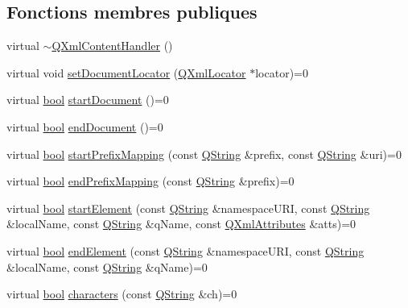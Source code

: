 \subsection*{Fonctions membres publiques}
\begin{DoxyCompactItemize}
\item 
virtual \hyperlink{class_q_xml_content_handler_a217939b7d7636fb8d52b415a890939a3}{$\sim$\+Q\+Xml\+Content\+Handler} ()
\item 
virtual void \hyperlink{class_q_xml_content_handler_a89863bd9a6372d3d73086aa99107bca7}{set\+Document\+Locator} (\hyperlink{class_q_xml_locator}{Q\+Xml\+Locator} $\ast$locator)=0
\item 
virtual \hyperlink{qglobal_8h_a1062901a7428fdd9c7f180f5e01ea056}{bool} \hyperlink{class_q_xml_content_handler_aaca36268e66c9a56257e38bce18ae4d2}{start\+Document} ()=0
\item 
virtual \hyperlink{qglobal_8h_a1062901a7428fdd9c7f180f5e01ea056}{bool} \hyperlink{class_q_xml_content_handler_a534bd1e4627e65340eb17d90d1ab1c12}{end\+Document} ()=0
\item 
virtual \hyperlink{qglobal_8h_a1062901a7428fdd9c7f180f5e01ea056}{bool} \hyperlink{class_q_xml_content_handler_acdf18588f1980d19d12efd025a5f5cc9}{start\+Prefix\+Mapping} (const \hyperlink{class_q_string}{Q\+String} \&prefix, const \hyperlink{class_q_string}{Q\+String} \&uri)=0
\item 
virtual \hyperlink{qglobal_8h_a1062901a7428fdd9c7f180f5e01ea056}{bool} \hyperlink{class_q_xml_content_handler_a1c7f3e794c2e763e043eef3229ccf034}{end\+Prefix\+Mapping} (const \hyperlink{class_q_string}{Q\+String} \&prefix)=0
\item 
virtual \hyperlink{qglobal_8h_a1062901a7428fdd9c7f180f5e01ea056}{bool} \hyperlink{class_q_xml_content_handler_af6d4e631fad2b9b75622c95003b1da55}{start\+Element} (const \hyperlink{class_q_string}{Q\+String} \&namespace\+U\+R\+I, const \hyperlink{class_q_string}{Q\+String} \&local\+Name, const \hyperlink{class_q_string}{Q\+String} \&q\+Name, const \hyperlink{class_q_xml_attributes}{Q\+Xml\+Attributes} \&atts)=0
\item 
virtual \hyperlink{qglobal_8h_a1062901a7428fdd9c7f180f5e01ea056}{bool} \hyperlink{class_q_xml_content_handler_af0abc06326798a6e522f91e6174b7b9e}{end\+Element} (const \hyperlink{class_q_string}{Q\+String} \&namespace\+U\+R\+I, const \hyperlink{class_q_string}{Q\+String} \&local\+Name, const \hyperlink{class_q_string}{Q\+String} \&q\+Name)=0
\item 
virtual \hyperlink{qglobal_8h_a1062901a7428fdd9c7f180f5e01ea056}{bool} \hyperlink{class_q_xml_content_handler_a3be0d440b48836560c8805e15d596eb1}{characters} (const \hyperlink{class_q_string}{Q\+String} \&ch)=0

\end{DoxyCompactItemize}
